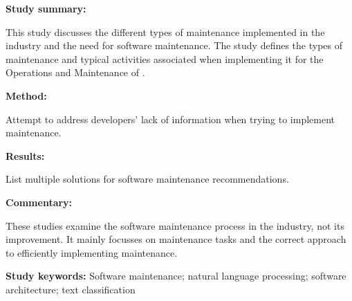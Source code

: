 \begin{tcolorbox}[colback=gray!5!white, colframe=pastelgreen!40!black, title=Supporting Software Architecture Maintenance by Providing Task-specific Recommendations \cite{Galster2019}]
	\begin{minipage}[t]{0.25\textwidth}
		\textbf{Study summary:}
	\end{minipage}
	\hfill
	\begin{minipage}[t]{0.65\textwidth}
		This study discusses the different types of maintenance implemented in the industry and the
		need for software maintenance. The study defines the types of maintenance and typical activities associated when implementing it for the Operations and Maintenance of .
	\end{minipage}

	\vspace{0.75em} 

	\begin{minipage}[t]{0.25\textwidth}
		\textbf{Method:}
	\end{minipage}
	\hfill
	\begin{minipage}[t]{0.65\textwidth}
		Attempt to address developers' lack of information when trying to implement maintenance.
	\end{minipage}

	\vspace{0.75em} 

	\begin{minipage}[t]{0.25\textwidth}
		\textbf{Results:}
	\end{minipage}
	\hfill
	\begin{minipage}[t]{0.65\textwidth}
		List multiple solutions for software maintenance recommendations.
	\end{minipage}

	\vspace{0.75em} 

	\begin{minipage}[t]{0.25\textwidth}
		\textbf{Commentary:}
	\end{minipage}
	\hfill
	\begin{minipage}[t]{0.65\textwidth}
		These studies examine the software maintenance process in the industry, not its improvement. It mainly focusses on maintenance tasks and the correct approach to efficiently
implementing maintenance.
	\end{minipage}
	\tcblower
	\textbf{Study keywords:} Software maintenance; natural language processing; software
	architecture; text classification
\end{tcolorbox}

